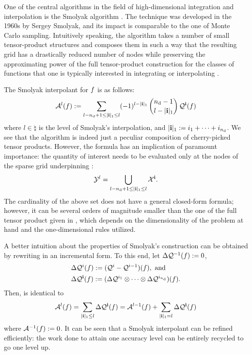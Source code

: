 One of the central algorithms in the field of high-dimensional integration and
interpolation is the Smolyak algorithm \cite{smolyak1963}. The technique was
developed in the 1960s by Sergey Smolyak, and its impact is comparable to the
one of Monte Carlo sampling. Intuitively speaking, the algorithm takes a number
of small tensor-product structures and composes them in such a way that the
resulting grid has a drastically reduced number of nodes while preserving the
approximating power of the full tensor-product construction for the classes of
functions that one is typically interested in integrating or interpolating
\cite{klimke2006}.

The Smolyak interpolant for $f$ is as follows:
\begin{equation} \elab{smolyak}
  \smolyak{l}(\f) := \sum_{l - \nin + 1 \leq |\vi|_1 \leq l} (-1)^{l - |\vi|_1} \, {\nin - 1 \choose l - |\vi|_1} \, \tensor{\vi}(\f)
\end{equation}
where $l \in \natural$ is the level of Smolyak's interpolation, and $|\mathbf{i}|_1 :=
i_1 + \dots + i_{n_\text{d}}$. We see that the algorithm is indeed just a peculiar
composition of cherry-picked tensor products. However, the formula has an
implication of paramount importance: the quantity of interest needs to be
evaluated only at the nodes of the sparse grid underpinning :
\begin{equation} \elab{smolyak-grid}
  \Y^l = \bigcup_{l - \nin + 1 \leq |\vi|_1 \leq l} \X^\vi.
\end{equation}
The cardinality of the above set does not have a general closed-form formula;
however, it can be several orders of magnitude smaller than the one of the full
tensor product given in , which depends on the
dimensionality of the problem at hand and the one-dimensional rules utilized.

A better intuition about the properties of Smolyak's construction can be
obtained by rewriting  in an incremental form. To this end, let
$\Delta\mathcal{Q}^{-1}(f) := 0$,
\begin{align}
  & \Delta\tensor{i}(\f) := (\tensor{i} - \tensor{i - 1})(\f), \text{ and} \elab{tensor-delta-1d} \\
  & \Delta\tensor{\vi}(\f) := (\Delta\tensor{i_1} \otimes \cdots \otimes
  \Delta\tensor{i_\nin})(\f). \nonumber
\end{align}
Then,  is identical to
\begin{equation} \elab{smolyak-incremental}
  \smolyak{l}(\f) = \sum_{|\vi|_1 \leq l} \Delta\tensor{\vi}(\f) = \smolyak{l - 1}(\f) + \sum_{|\vi|_1 = l} \Delta\tensor{\vi}(\f)
\end{equation}
where $\mathcal{A}^{-1}(f) := 0$. It can be seen that a Smolyak interpolant can be
refined efficiently: the work done to attain one accuracy level can be entirely
recycled to go one level up.

